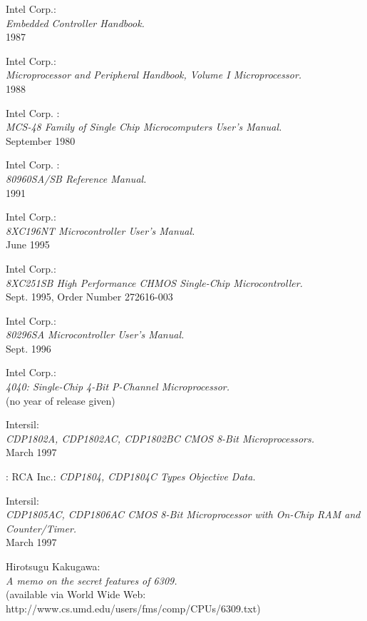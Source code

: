  Intel Corp.: \\
		{\em Embedded Controller Handbook.\/} \\
		1987

 Intel Corp.: \\
		{\em Microprocessor and Peripheral Handbook, Volume I
		Microprocessor.\/} \\
		1988

  Intel Corp. : \\
		{\em MCS-48 Family of Single Chip Microcomputers User's Manual.\/} \\
		September 1980

 Intel Corp. : \\
		{\em 80960SA/SB Reference Manual.\/} \\
		1991

 Intel Corp.: \\
		{\em 8XC196NT Microcontroller User's Manual.\/} \\
		June 1995

 Intel Corp.: \\
		{\em 8XC251SB High Performance CHMOS Single-Chip
		Microcontroller.\/} \\
		Sept. 1995, Order Number 272616-003

 Intel Corp.: \\
		{\em 80296SA Microcontroller User's Manual.\/} \\
		Sept. 1996

 Intel Corp.: \\
		{\em 4040: Single-Chip 4-Bit P-Channel
		Microprocessor.\/} \\
		(no year of release given)

 Intersil: \\
		{\em CDP1802A, CDP1802AC, CDP1802BC CMOS 8-Bit
		Microprocessors.\/} \\
		March 1997

: RCA Inc.:
		{\em CDP1804, CDP1804C Types Objective Data.}

 Intersil: \\
		{\em CDP1805AC, CDP1806AC CMOS 8-Bit Microprocessor
		with On-Chip RAM and Counter/Timer.\/} \\
		March 1997

 Hirotsugu Kakugawa: \\
		{\em A memo on the secret features of 6309.\/} \\
		(available via World Wide Web: \\
		http://www.cs.umd.edu/users/fms/comp/CPUs/6309.txt)

